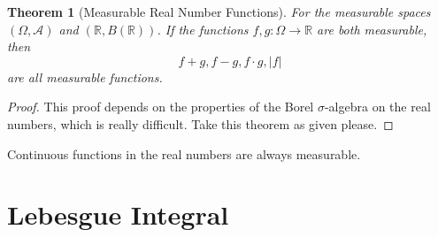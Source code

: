 \documentclass{article}
\newtheorem{theorem}{Theorem}[section]
\begin{document}
\begin{theorem}[Measurable Real Number Functions]
    For the measurable spaces $(\Omega, \mathcal A)$ and $(\mathbb{R}, B(\mathbb{R}))$. If the functions $f,g \colon \Omega \to \mathbb{R}$ are both measurable, then
    \[
        f+g, f-g, f \cdot g, |f|
    \]
    are all measurable functions.
\end{theorem}
\begin{proof}
    This proof depends on the properties of the Borel $\sigma$-algebra on the real numbers, which is really difficult. Take this theorem as given please.
\end{proof}

Continuous functions in the real numbers are always measurable.

\newpage
\section{Lebesgue Integral}
\end{document}
